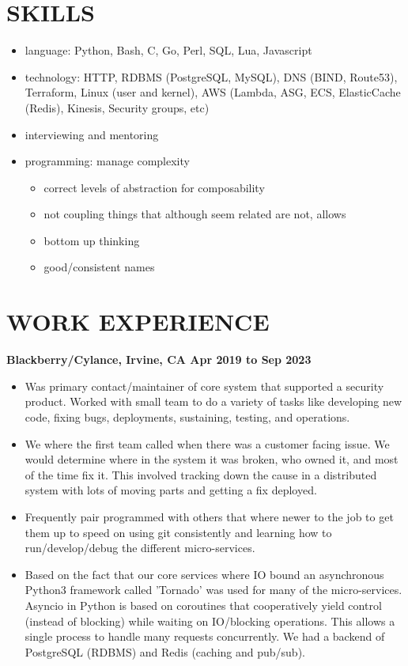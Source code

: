 \documentclass{res}
\begin{document}
\address{john@jjdev.com - (657) 400 9422 - Westminster, CA 92683}

\begin{resume}
  \section{SKILLS}
  \begin{itemize}
  \item
    language: Python, Bash, C, Go, Perl, SQL, Lua, Javascript
  \item
      technology: HTTP, RDBMS (PostgreSQL, MySQL), DNS (BIND, Route53), Terraform, Linux (user and kernel), AWS (Lambda, ASG, ECS, ElasticCache (Redis), Kinesis, Security groups, etc)
  \item
      interviewing and mentoring
  \item
      programming: manage complexity 
    \begin{itemize}
    \item
        correct levels of abstraction for composability
    \item
        not coupling things that although seem related are not, allows
    \item
        bottom up thinking
    \item
        good/consistent names
    \end{itemize}
  \end{itemize}

  \section{WORK EXPERIENCE}
  {\large \bf Blackberry/Cylance, Irvine, CA \hfill Apr 2019 to Sep 2023}
  \begin{itemize}
  \item
    Was primary contact/maintainer of core system that supported a
    security product.  Worked with small team to do a variety of tasks
    like developing new code, fixing bugs, deployments, sustaining,
    testing, and operations.
  \item
    We where the first team called when there was a customer facing
    issue. We would determine where in the system it was broken, who
    owned it, and most of the time fix it.  This involved tracking down
    the cause in a distributed system with lots of moving parts and
    getting a fix deployed.
  \item
    Frequently pair programmed with others that where newer to the job
    to get them up to speed on using git consistently and learning how
    to run/develop/debug the different micro-services.
  \item
Based on the fact that our core services where IO bound
an asynchronous Python3 framework called 'Tornado' was used for many
of the micro-services. Asyncio in Python is based on coroutines that
cooperatively yield control (instead of blocking) while waiting on
IO/blocking operations. This allows a single process to handle many
requests concurrently.  We had a backend of PostgreSQL (RDBMS) and Redis
(caching and pub/sub).


\end{itemize}
\end{resume}
\end{document}
